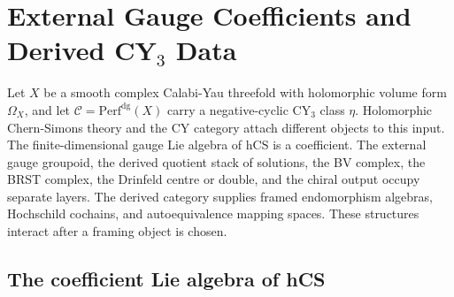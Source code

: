 \providecommand{\C}{\mathbb{C}}
\providecommand{\Z}{\mathbb{Z}}
\providecommand{\cC}{\mathcal{C}}
\providecommand{\cE}{\mathcal{E}}
\providecommand{\cO}{\mathcal{O}}
\providecommand{\cA}{\mathcal{A}}
\providecommand{\cG}{\mathcal{G}}
\providecommand{\cP}{\mathcal{P}}
\providecommand{\cM}{\mathcal{M}}
\providecommand{\cZ}{\mathcal{Z}}
\providecommand{\fg}{\mathfrak{g}}
\providecommand{\cL}{\mathcal{L}}
\providecommand{\hCS}{\mathrm{hCS}}
\providecommand{\Perf}{\mathrm{Perf}}
\providecommand{\Aut}{\mathrm{Aut}}
\providecommand{\Autinf}{\mathrm{Aut}_{\infty}}
\providecommand{\Map}{\operatorname{Map}}
\providecommand{\End}{\operatorname{End}}
\providecommand{\RHom}{R\operatorname{Hom}}
\providecommand{\REnd}{R\operatorname{End}}
\providecommand{\Tr}{\operatorname{Tr}}
\providecommand{\Sym}{\operatorname{Sym}}
\providecommand{\HH}{\operatorname{HH}}
\providecommand{\CoHA}{\operatorname{CoHA}}
\providecommand{\PV}{\operatorname{PV}}
\providecommand{\Obs}{\operatorname{Obs}}
\providecommand{\Crit}{\operatorname{Crit}}
\providecommand{\MC}{\operatorname{MC}}
\providecommand{\CE}{\operatorname{CE}}
\providecommand{\dbar}{\bar\partial}
\providecommand{\BV}{\operatorname{BV}}
\providecommand{\BRST}{\operatorname{BRST}}
\providecommand{\Eone}{E_1}
\providecommand{\Etwo}{E_2}
\providecommand{\Ethree}{E_3}
\providecommand{\Yp}{Y^{+}}
\providecommand{\gglone}{\widehat{\mathfrak{gl}}_1}
\providecommand{\Wilpha}{\mathcal{W}_{1+\infty}}

\section*{External Gauge Coefficients and Derived CY$_3$ Data}
\label{sec:gauge-external-derived-drinfeld}

Let \(X\) be a smooth complex Calabi-Yau threefold with holomorphic
volume form \(\Omega_X\), and let
\(\cC=\Perf^{\mathrm{dg}}(X)\) carry a negative-cyclic CY$_3$ class
\(\eta\). Holomorphic Chern-Simons theory and the CY category attach
different objects to this input. The finite-dimensional gauge Lie
algebra of hCS is a coefficient. The external gauge groupoid, the
derived quotient stack of solutions, the BV complex, the BRST complex,
the Drinfeld centre or double, and the chiral output occupy separate
layers. The derived category supplies framed endomorphism algebras,
Hochschild cochains, and autoequivalence mapping spaces. These
structures interact after a framing object is chosen.

\subsection*{The coefficient Lie algebra of hCS}

